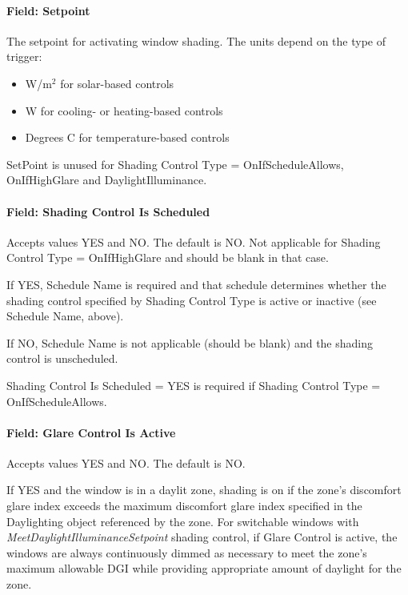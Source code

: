 \paragraph{Field: Setpoint}\label{field-setpoint}

The setpoint for activating window shading. The units depend on the type of trigger:

\begin{itemize}
\item
  W/m\(^{2}\) for solar-based controls
\item
  W for cooling- or heating-based controls
\item
  Degrees C for temperature-based controls
\end{itemize}

SetPoint is unused for Shading Control Type = OnIfScheduleAllows, OnIfHighGlare and DaylightIlluminance.

\paragraph{Field: Shading Control Is Scheduled}\label{field-shading-control-is-scheduled}

Accepts values YES and NO. The default is NO. Not applicable for Shading Control Type = OnIfHighGlare and should be blank in that case.

If YES, Schedule Name is required and that schedule determines whether the shading control specified by Shading Control Type is active or inactive (see Schedule Name, above).

If NO, Schedule Name is not applicable (should be blank) and the shading control is unscheduled.

Shading Control Is Scheduled = YES is required if Shading Control Type = OnIfScheduleAllows.

\paragraph{Field: Glare Control Is Active}\label{field-glare-control-is-active}

Accepts values YES and NO. The default is NO.

If YES and the window is in a daylit zone, shading is on if the zone's discomfort glare index exceeds the maximum discomfort glare index specified in the Daylighting object referenced by the zone. For switchable windows with \emph{MeetDaylightIlluminanceSetpoint} shading control, if Glare Control is active, the windows are always continuously dimmed as necessary to meet the zone's maximum allowable DGI while providing appropriate amount of daylight for the zone.

